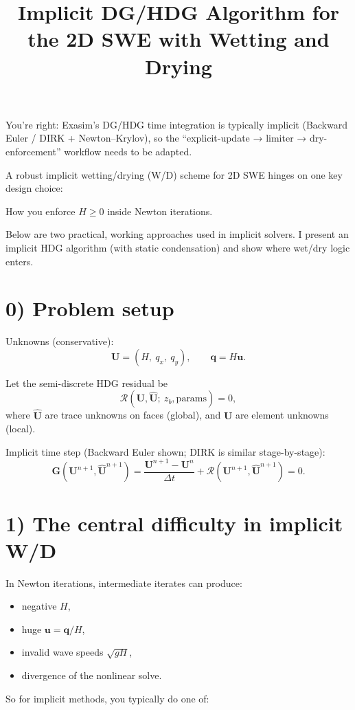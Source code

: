 \documentclass[11pt]{article}
\title{Implicit DG/HDG Algorithm for the 2D SWE with Wetting and Drying}
\author{}
\date{}
\begin{document}
\maketitle

You’re right: Exasim’s DG/HDG time integration is typically implicit (Backward Euler / DIRK + Newton–Krylov), so the ``explicit-update → limiter → dry-enforcement'' workflow needs to be adapted.

A robust implicit wetting/drying (W/D) scheme for 2D SWE hinges on one key design choice:

How you enforce $H \ge 0$ inside Newton iterations.

Below are two practical, working approaches used in implicit solvers. I present an implicit HDG algorithm (with static condensation) and show where wet/dry logic enters.

\section*{0) Problem setup}

Unknowns (conservative):
\[
\mathbf{U} = (H,\ q_x,\ q_y), \qquad \mathbf{q} = H\mathbf{u}.
\]

Let the semi-discrete HDG residual be
\[
\mathcal{R}(\mathbf{U}, \widehat{\mathbf{U}};\ z_b,\text{params}) = 0,
\]
where $\widehat{\mathbf{U}}$ are trace unknowns on faces (global), and $\mathbf{U}$ are element unknowns (local).

Implicit time step (Backward Euler shown; DIRK is similar stage-by-stage):
\[
\mathbf{G}(\mathbf{U}^{n+1}, \widehat{\mathbf{U}}^{n+1})
=
\frac{\mathbf{U}^{n+1}-\mathbf{U}^n}{\Delta t}
+\mathcal{R}(\mathbf{U}^{n+1},\widehat{\mathbf{U}}^{n+1})
=0.
\]

\section*{1) The central difficulty in implicit W/D}

In Newton iterations, intermediate iterates can produce:
\begin{itemize}
\item negative $H$,
\item huge $\mathbf{u}=\mathbf{q}/H$,
\item invalid wave speeds $\sqrt{gH}$,
\item divergence of the nonlinear solve.
\end{itemize}

So for implicit methods, you typically do one of:
\end{document}
